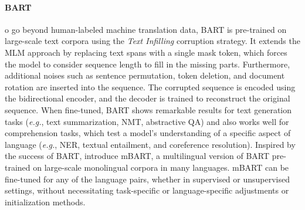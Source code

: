 \paragraph{BART}

o go beyond human-labeled machine translation data, \ac{BART} is pre-trained on large-scale text corpora using the \textit{Text Infilling} corruption strategy. It extends the \ac{MLM} approach by replacing text spans with a single mask token, which forces the model to consider sequence length to fill in the missing parts. Furthermore, additional noises such as sentence permutation, token deletion, and document rotation are inserted into the sequence. The corrupted sequence is encoded using the bidirectional encoder, and the decoder is trained to reconstruct the original sequence. When fine-tuned, \ac{BART} shows remarkable results for text generation tasks (\textit{e.g.}, text summarization, \ac{NMT}, abstractive \ac{QA}) and also works well for comprehension tasks, which test a model's understanding of a specific aspect of language (\textit{e.g.}, \ac{NER}, textual entailment, and coreference resolution). Inspired by the success of \ac{BART}, \citet{liu2020multilingual} introduce mBART, a multilingual version of \ac{BART} pre-trained on large-scale monolingual corpora in many languages. mBART can be fine-tuned for any of the language pairs, whether in supervised or unsupervised settings, without necessitating task-specific or language-specific adjustments or initialization methods.




